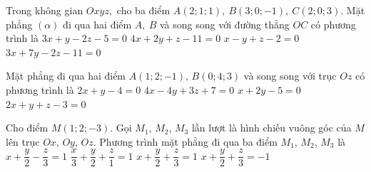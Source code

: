 \begin{ex}%
	Trong không gian $Oxyz,$ cho ba điểm $A(2;1;1),\ B(3;0;-1),\ C(2;0;3)$. Mặt phẳng $(\alpha)$ đi qua hai điểm $A,\ B$ và song song với đường thẳng $OC$ có phương trình là
	\choice
	{$3x+y-2z-5=0$}
	{$4x+2y+z-11=0$}
	{$x-y+z-2=0$}
	{\True $3x+7y-2z-11=0$}
\end{ex}
\begin{ex}
	Mặt phẳng đi qua hai điểm $A(1;2;-1)$, $B(0;4;3)$ và song song với trục $Oz$ có phương trình là
	\choice
	{\True $2x + y -4 =0$}
	{$4x - 4y +3 z+7 =0$}
	{$x + 2y -5=0$}
	{$2x + y+z -3 =0$}
\end{ex}

\begin{ex}%
	Cho điểm $M(1;2;-3)$. Gọi $M_{1}$, $M_{2}$, $M_{3}$ lần lượt là hình chiếu vuông góc của $M$ lên trục $Ox$, $Oy$, $Oz$. Phương trình mặt phẳng đi qua ba điểm $M_{1}$, $M_{2}$, $M_{3}$ là
	\haicot
	{\True $x+\dfrac{y}{2}-\dfrac{z}{3}=1$}
	{$\dfrac{x}{3}+\dfrac{y}{2}+\dfrac{z}{1}=1$}
	{$x+\dfrac{y}{2}+\dfrac{z}{3}=1$}
	{$x+\dfrac{y}{2}+\dfrac{z}{3}=-1$}
\end{ex}

